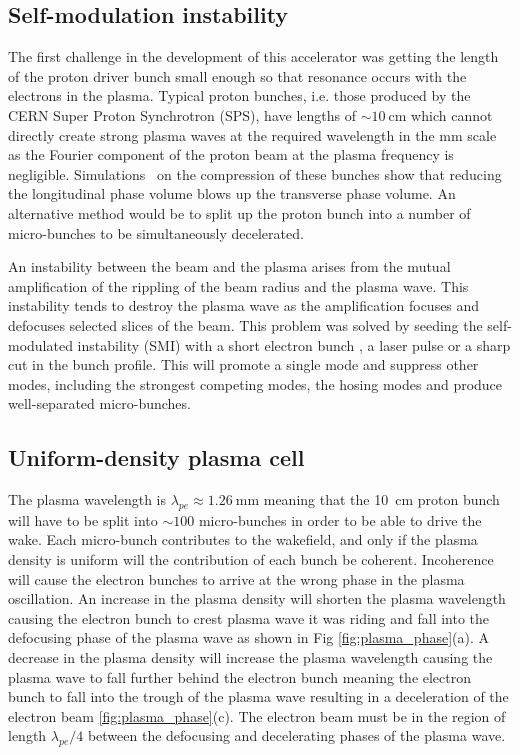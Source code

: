 \subsection{Self-modulation instability}

The first challenge in the development of this accelerator was getting the
length of the proton driver bunch small enough so that resonance occurs with
the electrons in the plasma.  Typical proton bunches, i.e. those produced by
the CERN Super Proton Synchrotron (SPS), have lengths of \(\sim
\SI{10}{\centi\meter}\) which cannot directly create strong plasma waves at the
required wavelength in the \si{\milli\meter} scale as the Fourier component of
the proton beam at the plasma frequency is negligible.
Simulations~\cite{kumar2010self} on the compression of these bunches show that
reducing the longitudinal phase volume blows up the transverse phase volume.
An alternative method would be to split up the proton bunch into a number of
micro-bunches to be simultaneously decelerated.

An instability between the beam and the plasma arises from the mutual
amplification of the rippling of the beam radius and the plasma wave. This
instability tends to destroy the plasma wave as the amplification focuses and
defocuses selected slices of the beam.  This problem was solved by seeding the
self-modulated instability (SMI) with a short electron bunch
\cite{lotov2013natural}, a laser pulse \cite{siemon2013laser} or a sharp cut in
the bunch profile\cite{kumar2010self}. This will promote a single mode and
suppress other modes, including the strongest competing modes, the hosing modes
\cite{vieira2014hosing} and produce well-separated micro-bunches.

\subsection{Uniform-density plasma cell}

The plasma wavelength is \(\lambda_{pe} \approx \SI{1.26}{\milli\meter}\)
meaning that the \SI{10}{\centi\meter} proton bunch will have to be split into
\(\sim 100\) micro-bunches in order to be able to drive the wake.  Each
micro-bunch contributes to the wakefield, and only if the plasma density is
uniform will the contribution of each bunch be coherent. Incoherence will cause
the electron bunches to arrive at the wrong phase in the plasma oscillation. An
increase in the plasma density will shorten the plasma wavelength causing the
electron bunch to crest plasma wave it was riding and fall into the defocusing
phase of the plasma wave as shown in Fig \ref{fig:plasma_phase}(a). A decrease
in the plasma density will increase the plasma wavelength causing the plasma
wave to fall further behind the electron bunch meaning the electron bunch to
fall into the trough of the plasma wave resulting in a deceleration of the
electron beam \ref{fig:plasma_phase}(c). The electron beam must be in the
region of length \(\lambda_{pe}/4\) between the defocusing and decelerating
phases of the plasma wave.

